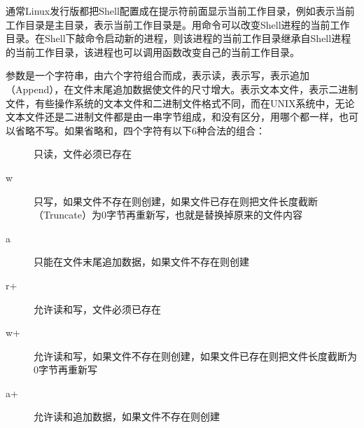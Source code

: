

通常Linux发行版都把Shell配置成在提示符前面显示当前工作目录，例如\BookCode{\textasciitilde{}\BookSplit{}\$}表示当前工作目录是主目录，表示当前工作目录是。用命令可以改变Shell进程的当前工作目录。在Shell下敲命令启动新的进程，则该进程的当前工作目录继承自Shell进程的当前工作目录，该进程也可以调用函数改变自己的当前工作目录。



参数是一个字符串，由六个字符组合而成，表示读，表示写，表示追加（Append），在文件末尾追加数据使文件的尺寸增大。表示文本文件，表示二进制文件，有些操作系统的文本文件和二进制文件格式不同，而在UNIX系统中，无论文本文件还是二进制文件都是由一串字节组成，和没有区分，用哪个都一样，也可以省略不写。如果省略和，四个字符有以下6种合法的组合：


\begin{description}
\item[{}]


只读，文件必须已存在

\item[{\BookQuoteChar{}w\BookQuoteChar{}}]


只写，如果文件不存在则创建，如果文件已存在则把文件长度截断（Truncate）为0字节再重新写，也就是替换掉原来的文件内容

\item[{\BookQuoteChar{}a\BookQuoteChar{}}]


只能在文件末尾追加数据，如果文件不存在则创建

\item[{\BookQuoteChar{}r+\BookSplit{}\BookQuoteChar{}}]


允许读和写，文件必须已存在

\item[{\BookQuoteChar{}w+\BookSplit{}\BookQuoteChar{}}]


允许读和写，如果文件不存在则创建，如果文件已存在则把文件长度截断为0字节再重新写

\item[{\BookQuoteChar{}a+\BookSplit{}\BookQuoteChar{}}]


允许读和追加数据，如果文件不存在则创建


\end{description}


